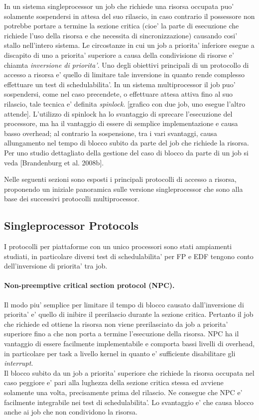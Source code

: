 In un sistema singleprocessor un job che richiede una risorsa occupata puo' solamente sospendersi in attesa del suo rilascio, in caso contrario il possessore non potrebbe portare a termine la sezione critica (cioe' la parte di esecuzione che richiede l'uso della risorsa e che necessita di sincronizzazione) causando cosi' stallo nell'intero sistema. Le circostanze in cui un job a priorita' inferiore esegue a discapito di uno a priorita' superiore a causa della condivisione di risorse e' chiamta \textit{inversione di priorita'}. Uno degli obiettivi principali di un protocollo di accesso a risorsa e' quello di limitare tale inversione in quanto rende complesso effettuare un test di schedulabilita'. In un sistema multiprocessor il job puo' sospendersi, come nel caso precendete, o effettuare attesa attiva fino al suo rilascio, tale tecnica e' definita \textit{spinlock}. [grafico con due job, uno esegue l'altro attende]. L'utilizzo di spinlock ha lo svantaggio di sprecare l'esecuzione del processore, ma ha il vantaggio di essere di semplice implementazione e causa basso overhead; al contrario la sospensione, tra i vari svantaggi, causa allungamento nel tempo di blocco subito da parte del job che richiede la risorsa. Per uno studio dettagliato della gestione del caso di blocco da parte di un job si veda [Brandenburg et al. 2008b].

Nelle seguenti sezioni sono esposti i principali protocolli di accesso a risorsa, proponendo un iniziale panoramica sulle versione singleprocessor che sono alla base dei successivi protocolli multiprocessor.

\subsection{Singleprocessor Protocols}
\label{sec:lockProtocols.single}

I protocolli per piattaforme con un unico processori sono stati ampiamenti studiati, in particolare diversi test di schedulabilita' per FP e EDF tengono conto dell'inversione di priorita' tra job.

\paragraph{Non-preemptive critical section protocol (NPC).} Il modo piu' semplice per limitare il tempo di blocco causato dall'inversione di priorita' e' quello di inibire il prerilascio durante la sezione critica. Pertanto il job che richiede ed ottiene la risorsa non viene prerilasciato da job a priorita' superiore fino a che non porta a termine l'esecuzione della risorsa. NPC ha il vantaggio di essere facilmente implementabile e comporta bassi livelli di overhead, in particolare per task a livello kernel in quanto e' sufficiente disabilitare gli \textit{interrupt}.\\
Il blocco subito da un job a priorita' superiore che richiede la risorsa occupata nel caso peggiore e' pari alla lughezza della sezione critica stessa ed avviene solamente una volta, precisamente prima del rilascio. Ne consegue che NPC e' facilmente integrabile nei test di schedulabilita'. Lo svantaggio e' che causa blocco anche ai job che non condividono la risorsa.\\

